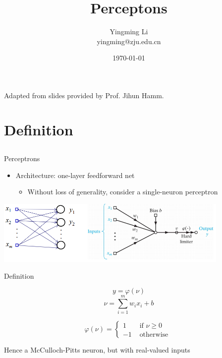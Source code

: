 \documentclass[notes]{beamer}
\title[Opt for ML]{Perceptons}
\author[YingmingLi]{Yingming Li \\ yingming@zju.edu.cn}
\institute[DSERC, ZJU]{Data Science \& Engineering Research Center, ZJU}
\date[\today]{\today}
\providecommand{\tightlist}{%
  \setlength{\itemsep}{0pt}\setlength{\parskip}{0pt}}
\begin{document}



\begin{frame}
	\titlepage
	\begin{center}
		Adapted from slides provided by Prof. Jihun Hamm.		
	\end{center}

\end{frame}

\section{Definition}\label{definition}

\subsection{}\label{section}

\begin{frame}{Perceptrons}

\begin{itemize}
\tightlist
\item
  Architecture: one-layer feedforward net

  \begin{itemize}
  \tightlist
  \item
    Without loss of generality, consider a single-neuron perceptron
  \end{itemize}
\end{itemize}

\centering
\includegraphics[width=0.85000\textwidth]{2018-03-08-21-55-42.png}\\

\end{frame}

\begin{frame}{Definition}

\[y=\varphi(\nu)\] \[\nu=\sum_{i=1}^{m} w_i x_i +b \]

\[\varphi (\nu) = \left\{ \begin{array}{cc}
    1  & \text{ if } \nu \ge 0 \\ 
    -1 & \text{ otherwise } 
    \end{array} \right. \]

Hence a McCulloch-Pitts neuron, but with real-valued inputs

\end{frame}
\end{document}
